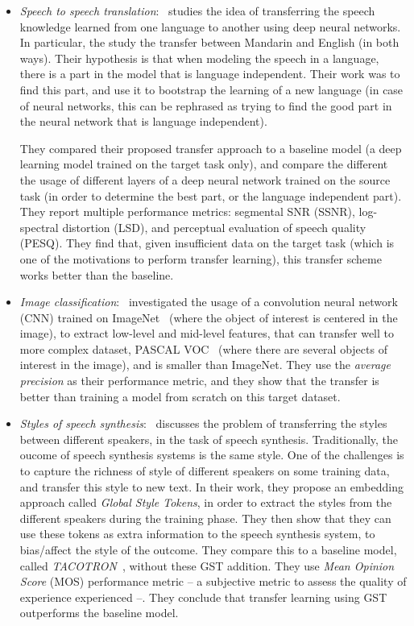 \begin{itemize}
      \item \textit{Speech to speech translation}:~\citep{xu2014cross} studies the idea of transferring the speech knowledge learned from one language to another using deep neural networks. In particular, the study the transfer between Mandarin and English (in both ways). Their hypothesis is that when modeling the speech in a language, there is a part in the model that is language independent. Their work was to find this part, and use it to bootstrap the learning of a new language (in case of neural networks, this can be rephrased as trying to find the good part in the neural network that is language independent).

      They compared their proposed transfer approach to a baseline model (a deep learning model trained on the target task only), and compare the different the usage of different layers of a deep neural network trained on the source task (in order to determine the best part, or the language independent part). They report multiple performance metrics: segmental SNR (SSNR), log-spectral distortion (LSD), and perceptual evaluation of speech quality (PESQ). They find that, given insufficient data on the target task (which is one of the motivations to perform transfer learning), this transfer scheme works better than the baseline.

      \item \textit{Image classification}:~\citep{oquab2014learning} investigated the usage of a convolution neural network (CNN) trained on ImageNet~\citep{imagenet_cvpr09} (where the object of interest is centered in the image), to extract low-level and mid-level features, that can transfer well to more complex dataset, PASCAL VOC~\citep{everingham2010pascal} (where there are several objects of interest in the image), and is smaller than ImageNet. They use the \textit{average precision} as their performance metric, and they show that the transfer is better than training a model from scratch on this target dataset.

      \item \textit{Styles of speech synthesis}:~\citep{wang2018style} discusses the problem of transferring the styles between different speakers, in the task of speech synthesis. Traditionally, the oucome of speech synthesis systems is the same style. One of the challenges is to capture the richness of style of different speakers on some training data, and transfer this style to new text. In their work, they propose an embedding approach called \textit{Global Style Tokens}, in order to extract the styles from the different speakers during the training phase. They then show that they can use these tokens as extra information to the speech synthesis system, to bias/affect the style of the outcome.
      They compare this to a baseline model, called \textit{TACOTRON}~\citep{wang2017tacotron}, without these GST addition. They use \textit{Mean Opinion Score} (MOS) performance metric -- a subjective metric to assess the quality of experience experienced --. They conclude that transfer learning using GST outperforms the baseline model.

    \end{itemize}

